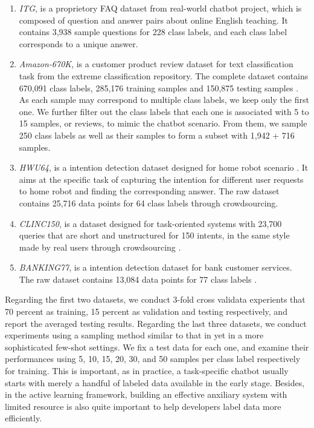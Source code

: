 \documentclass[letterpaper]{article} %
\begin{document}
  \begin{enumerate}
    \item \emph{ITG},  is  a proprietory FAQ dataset from real-world
    chatbot  project,  which is composed of question and answer pairs about online
    English teaching. It contains 3,938 sample questions for 228 class labels, and
    each class label corresponds to a unique answer.

    \item \emph{Amazon-670K}, is a customer product review dataset for
    text  classification  task  from  the  extreme  classification repository. The
    complete  dataset  contains 670,091 class labels, 285,176 training samples and
    150,875   testing   samples   \cite{bhatia2016extreme}.  As  each  sample  may
    correspond  to  multiple  class labels, we keep only the first one. We further
    filter  out the class labels that each one is associated with 5 to 15 samples,
    or  reviews,  to  mimic  the  chatbot scenario. From them, we sample 250 class
    labels as well as their samples to form a subset with 1,942 + 716 samples.

    \item \emph{HWU64}, is a intention detection dataset designed for
    home  robot  scenario \cite{liu2019benchmarking}. It aims at the specific task
    of  capturing  the  intention  for  different  user requests to home robot and
    finding  the corresponding answer. The raw dataset contains 25,716 data points
    for 64 class labels through crowdsourcing.

    \item \emph{CLINC150},  is  a dataset designed for task-oriented
    systems  with  23,700 queries that are short and unstructured for 150 intents,
    in    the    same   style   made   by   real   users   through   crowdsourcing
    \cite{larson2019evaluation}.

    \item \emph{BANKING77}, is a intention detection dataset for bank
    customer  services.  The  raw dataset contains 13,084 data points for 77 class
    labels \cite{casanueva2020efficient}.
  \end{enumerate}

  Regarding  the first two datasets, we conduct 3-fold cross validata experients
  that   70   percent   as  training,  15  percent  as  validation  and  testing
  respectively,  and  report  the  averaged  testing results. Regarding the last
  three datasets, we conduct experiments using a sampling method similar to that
  in   \cite{casanueva2020efficient}   yet  in  a  more  sophisticated  few-shot
  settings.  We  fix  a  test  data for each one, and examine their performances
  using  5,  10,  15,  20,  30,  and 50 samples per class label respectively for
  training.  This  is important, as in practice, a task-specific chatbot usually
  starts  with  merely  a  handful of labeled data available in the early stage.
  Besides,  in  the  active  learning framework, building an effective anxiliary
  system  with limited resource is also quite important to help developers label
  data more efficiently.
\end{document}

